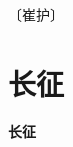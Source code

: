 \documentclass[12pt,UTF-8,openany,fontset=none]{ctexbook}
\begin{document}
\begin{center}
    \vspace{10pt}
    
    \begin{large}
        
        〔崔护〕
        
    \end{large}
    
    \vspace{8pt}
    
    \begin{huge}
        
        \phantom{。}

        \phantom{。}
        
        \phantom{。}

        \phantom{。}
        
    \end{huge}
    
\end{center}

\vspace{8pt}
\clearpage

\section{长征}



\begin{center}
    {\bfseries 长征}
\end{center}
\end{document}
